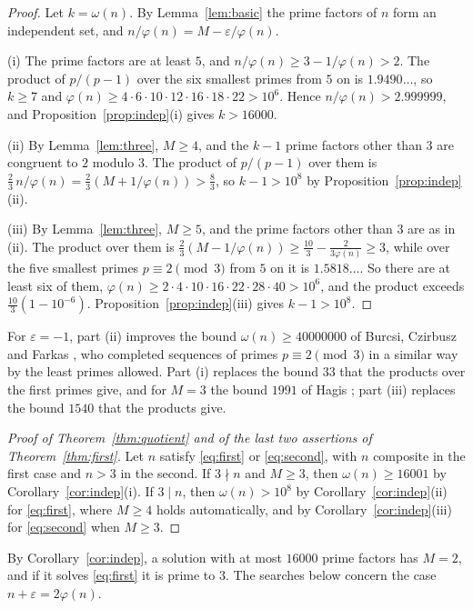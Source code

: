 \documentclass[screen,reqno]{aomart}
\numberwithin{equation}{section}
\theoremstyle{plain}
\theoremstyle{definition}
\theoremstyle{remark}
\begin{document}
\begin{proof}
Let $k=\omega(n)$. By Lemma~\ref{lem:basic} the prime factors of $n$
form an independent set, and $n/\varphi(n)=M-\varepsilon/\varphi(n)$.

(i) The prime factors are at least $5$, and
$n/\varphi(n)\ge3-1/\varphi(n)>2$. The product of $p/(p-1)$ over the
six smallest primes from $5$ on is $1.9490\ldots$, so $k\ge7$ and
$\varphi(n)\ge4\cdot6\cdot10\cdot12\cdot16\cdot18\cdot22>10^6$. Hence
$n/\varphi(n)>2.999999$, and Proposition~\ref{prop:indep}(i) gives
$k>16000$.

(ii) By Lemma~\ref{lem:three}, $M\ge4$, and the $k-1$ prime factors
other than $3$ are congruent to $2$ modulo $3$. The product of
$p/(p-1)$ over them is $\frac23\,n/\varphi(n)=\frac23(M+1/\varphi(n))>\frac83$,
so $k-1>10^8$ by Proposition~\ref{prop:indep}(ii).

(iii) By Lemma~\ref{lem:three}, $M\ge5$, and the prime factors other
than $3$ are as in (ii). The product over them is
$\frac23(M-1/\varphi(n))\ge\frac{10}3-\frac2{3\varphi(n)}\ge3$, while
over the five smallest primes $p\equiv2\pmod3$ from $5$ on it is
$1.5818\ldots$. So there are at least six of them,
$\varphi(n)\ge2\cdot4\cdot10\cdot16\cdot22\cdot28\cdot40>10^6$, and the
product exceeds $\frac{10}3(1-10^{-6})$. Proposition~\ref{prop:indep}(iii)
gives $k-1>10^8$.
\end{proof}

For $\varepsilon=-1$, part (ii) improves the bound $\omega(n)\ge40000000$
of Burcsi, Czirbusz and Farkas \cite{BCF11}, who completed sequences of
primes $p\equiv2\pmod3$ in a similar way by the least primes allowed.
Part (i) replaces the bound $33$ that the products over the first
primes give, and for $M=3$ the bound $1991$ of Hagis \cite{Hag88}; part
(iii) replaces the bound $1540$ that the products give.

\begin{proof}[Proof of Theorem~\ref{thm:quotient} and of the last two
assertions of Theorem~\ref{thm:first}]
Let $n$ satisfy \eqref{eq:first} or \eqref{eq:second}, with $n$
composite in the first case and $n>3$ in the second. If $3\nmid n$ and
$M\ge3$, then $\omega(n)\ge16001$ by Corollary~\ref{cor:indep}(i). If
$3\mid n$, then $\omega(n)>10^8$ by Corollary~\ref{cor:indep}(ii) for
\eqref{eq:first}, where $M\ge4$ holds automatically, and by
Corollary~\ref{cor:indep}(iii) for \eqref{eq:second} when $M\ge3$.
\end{proof}

By Corollary~\ref{cor:indep}, a solution with at most $16000$ prime
factors has $M=2$, and if it solves \eqref{eq:first} it is prime to
$3$. The searches below concern the case $n+\varepsilon=2\varphi(n)$.
\end{document}

